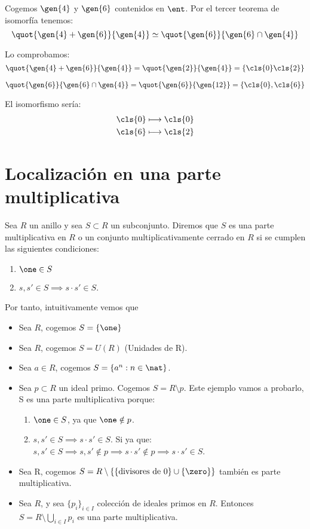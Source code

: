 \begin{example}
	Cogemos $\gen{4}$ y $\gen{6}$ contenidos en $\ent$. Por el tercer teorema de isomorfía tenemos:
	$$ \quot{\gen{4}+\gen{6}}{\gen{4}}\simeq \quot{\gen{6}}{\gen{6} \cap \gen{4}} $$
	
	Lo comprobamos:
	$$\quot{\gen{4}+\gen{6}}{\gen{4}} = \quot{\gen{2}}{\gen{4}}=\{ \cls{0} \cls{2} \}$$
	
	$$ \quot{\gen{6}}{\gen{6} \cap \gen{4}} = \quot{\gen{6}}{\gen{12}} = \{ \cls{0}, \cls{6} \}$$
	
	El isomorfismo sería:
	\begin{align*}
		\cls{0}  & \longmapsto  \cls{0}\\
		\cls{6} & \longmapsto \cls{2} \\
	\end{align*}
\end{example}

\section{Localización en una parte multiplicativa}
\begin{defn}
	Sea $R$ un anillo y sea $S\subset R$ un subconjunto. Diremos que $S$ es una parte multiplicativa en $R$ o un conjunto multiplicativamente cerrado en $R$ si se cumplen las siguientes condiciones:
	\begin{enumerate}
		\item $\one \in S$
		\item $s,s' \in S \implies s\cdot s' \in S$.
	\end{enumerate}
\end{defn}

Por tanto, intuitivamente vemos que 

\begin{example}
	\begin{itemize}
		\item Sea $R$, cogemos $S=\{\one \}$
		\item Sea $R$, cogemos $S=U(R)$ (Unidades de R).
		\item Sea $a \in R$, cogemos $S=\{ a^n: n \in \nat \}$.
		\item Sea $p \subset R$ un ideal primo. Cogemos $S=R \setminus p$. Este ejemplo vamos a probarlo, S es una parte multiplicativa porque:
		\begin{enumerate}
			\item $\one \in S$, ya que $\one \notin p$.
			\item $s,s' \in S \implies s\cdot s' \in S$. Si ya que: $s,s' \in S \implies s,s' \notin p \implies s\cdot s' \notin p \implies s\cdot s' \in S$.		 
		\end{enumerate}
		\item Sea R, cogemos $S= R \setminus \{\{ \text{divisores de 0}\}\cup \{ \zero \} \}$ también es parte multiplicativa.
		\item Sea $R$, y sea $\{p_i\}_{i\in I}$ colección de ideales primos en $R$. Entonces $S=R\setminus \bigcup_{i\in I}p_i$ es una parte multiplicativa.
	\end{itemize}
\end{example}

